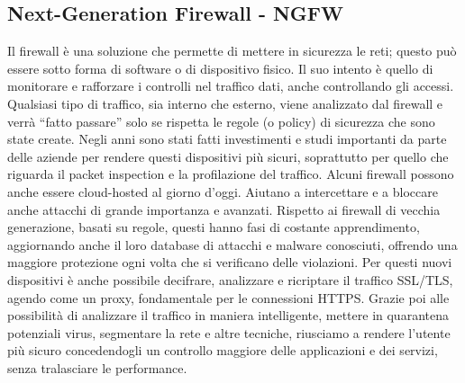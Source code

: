         \subsection{Next-Generation Firewall - NGFW}
            Il firewall è una soluzione che permette di mettere in sicurezza le reti; questo può essere sotto forma di software o di dispositivo fisico. Il suo intento è quello di monitorare e rafforzare i controlli nel traffico dati, anche controllando gli accessi. Qualsiasi tipo di traffico, sia interno che esterno, viene analizzato dal firewall e verrà “fatto passare” solo se rispetta le regole (o policy) di sicurezza che sono state create. Negli anni sono stati fatti investimenti e studi importanti da parte delle aziende per rendere questi dispositivi più sicuri, soprattutto per quello che riguarda il packet inspection e la 
            profilazione del traffico. Alcuni firewall possono anche essere cloud-hosted al giorno d'oggi.
            Aiutano a intercettare e a bloccare anche attacchi di grande importanza e avanzati.
            Rispetto ai firewall di vecchia generazione, basati su regole, questi hanno fasi di costante apprendimento, aggiornando anche il loro database di attacchi e malware conosciuti, offrendo una maggiore protezione ogni volta che si verificano delle violazioni. Per questi nuovi dispositivi è anche possibile decifrare, analizzare e ricriptare il traffico SSL/TLS, agendo come un proxy, fondamentale per le connessioni HTTPS.
            Grazie poi alle possibilità di analizzare il traffico in maniera 
            intelligente, mettere in quarantena potenziali virus, segmentare la rete e altre tecniche, riusciamo a rendere l'utente più sicuro concedendogli un controllo maggiore delle applicazioni e dei servizi, senza tralasciare le performance.


